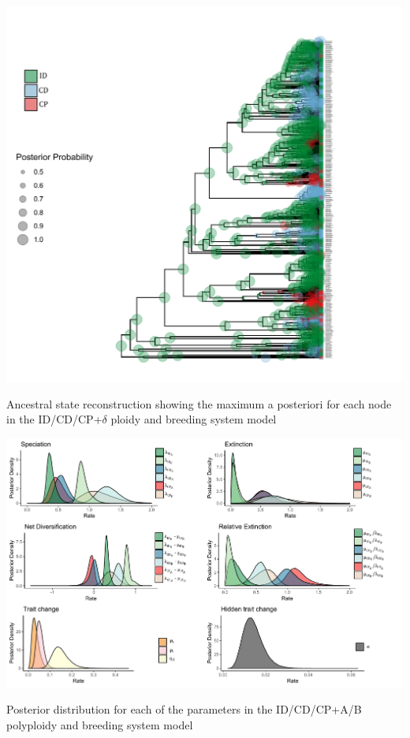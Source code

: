 \begin{suppfigure}
\includegraphics[width=\textwidth]{asrIDCDCPdelta.pdf}
\caption{Ancestral state reconstruction showing the maximum a posteriori for each node in the ID/CD/CP+$\delta$ ploidy and breeding system model} %
\label{suppfigure:IDCDCPasr}
\end{suppfigure}


\begin{suppfigure}
\includegraphics[width=\textwidth]{muhisseDPSInodipposteriordist.pdf}
\caption{Posterior distribution for each of the parameters in the ID/CD/CP+A/B polyploidy and breeding system model} %
\label{suppfigure:IDCDCPnodipAB}
\end{suppfigure}


